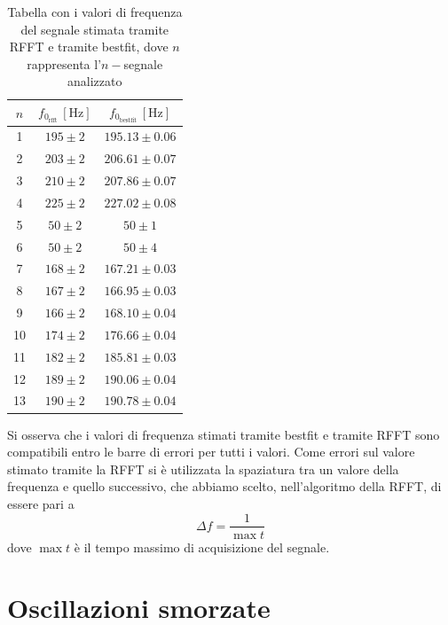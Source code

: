 \documentclass{article}
\begin{document}
\begin{table}[H]
    \centering
    \begin{tabular}{c c c}
        \toprule
        $n$ & $f_{0_\text{rfft}} \, [\text{Hz}]$ & $f_{0_\text{bestfit}} \, [\text{Hz}]$ \\
        \midrule
        1 & $195 \pm 2$         & $195.13 \pm 0.06$ \\
        2 & $203 \pm 2$       & $206.61 \pm 0.07$ \\
        3 & $210 \pm 2$         & $207.86 \pm 0.07$ \\
        4 & $225 \pm 2$         & $227.02 \pm 0.08$ \\
        5 & $50 \pm 2$          & $50 \pm 1$ \\
        6 & $50 \pm 2$          & $50 \pm 4$ \\
        7 & $168 \pm 2$         & $167.21 \pm 0.03$ \\
        8 & $167 \pm 2$         & $166.95 \pm 0.03$ \\
        9 & $166 \pm 2$         & $168.10 \pm 0.04$ \\
        10 & $174 \pm 2$        & $176.66 \pm 0.04$ \\
        11 & $182 \pm 2$        & $185.81 \pm 0.03$ \\
        12 & $189 \pm 2$        & $190.06 \pm 0.04$ \\
        13 & $190 \pm 2$        & $190.78 \pm 0.04$ \\
        \bottomrule
    \end{tabular}
    \caption{Tabella con i valori di frequenza del segnale stimata tramite RFFT e tramite bestfit, dove $n$ rappresenta l'$n-$segnale analizzato}
    \label{tab:cft_rfft_bestfit}
\end{table}
Si osserva che i valori di frequenza stimati tramite bestfit e tramite RFFT sono compatibili entro le barre di errori per tutti i valori. Come errori sul valore stimato tramite la RFFT si è utilizzata la spaziatura tra un valore della frequenza e quello successivo, che abbiamo scelto, nell'algoritmo della RFFT, di essere pari a 
$$
    \Delta f = \frac{1}{\max{t}}
$$
dove $\max{t}$ è il tempo massimo di acquisizione del segnale. 
\section{Oscillazioni smorzate}
\end{document}
